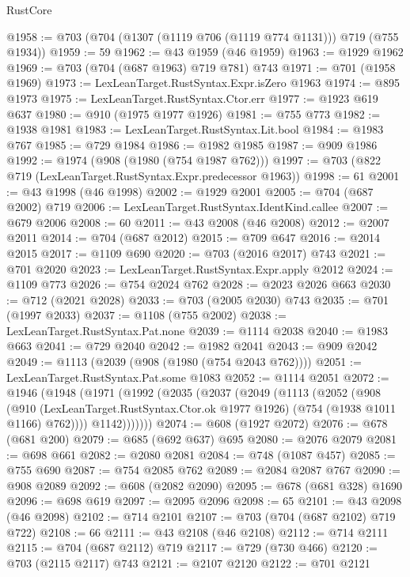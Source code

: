 \begin{lexlean}{RustCore}
\begin{coremodule}
@1958 := @703 (@704 (@1307 (@1119 @706 (@1119 @774 @1131))) @719 (@755 @1934))
@1959 := 59
@1962 := @43 @1959 (@46 @1959)
@1963 := @1929 @1962
@1969 := @703 (@704 (@687 @1963) @719 @781) @743
@1971 := @701 (@1958 @1969)
@1973 := LexLeanTarget.RustSyntax.Expr.isZero @1963
@1974 := @895 @1973
@1975 := LexLeanTarget.RustSyntax.Ctor.err
@1977 := @1923 @619 @637
@1980 := @910 (@1975 @1977 @1926)
@1981 := @755 @773
@1982 := @1938 @1981
@1983 := LexLeanTarget.RustSyntax.Lit.bool
@1984 := @1983 @767
@1985 := @729 @1984
@1986 := @1982 @1985
@1987 := @909 @1986
@1992 := @1974 (@908 (@1980 (@754 @1987 @762)))
@1997 := @703 (@822 @719 (LexLeanTarget.RustSyntax.Expr.predecessor @1963))
@1998 := 61
@2001 := @43 @1998 (@46 @1998)
@2002 := @1929 @2001
@2005 := @704 (@687 @2002) @719
@2006 := LexLeanTarget.RustSyntax.IdentKind.callee
@2007 := @679 @2006
@2008 := 60
@2011 := @43 @2008 (@46 @2008)
@2012 := @2007 @2011
@2014 := @704 (@687 @2012)
@2015 := @709 @647
@2016 := @2014 @2015
@2017 := @1109 @690
@2020 := @703 (@2016 @2017) @743
@2021 := @701 @2020
@2023 := LexLeanTarget.RustSyntax.Expr.apply @2012
@2024 := @1109 @773
@2026 := @754 @2024 @762
@2028 := @2023 @2026 @663
@2030 := @712 (@2021 @2028)
@2033 := @703 (@2005 @2030) @743
@2035 := @701 (@1997 @2033)
@2037 := @1108 (@755 @2002)
@2038 := LexLeanTarget.RustSyntax.Pat.none
@2039 := @1114 @2038
@2040 := @1983 @663
@2041 := @729 @2040
@2042 := @1982 @2041
@2043 := @909 @2042
@2049 := @1113 (@2039 (@908 (@1980 (@754 @2043 @762))))
@2051 := LexLeanTarget.RustSyntax.Pat.some @1083
@2052 := @1114 @2051
@2072 := @1946
    (@1948
      (@1971
        (@1992
          (@2035
            (@2037
              (@2049
                (@1113
                  (@2052
                    (@908
                      (@910
                        (LexLeanTarget.RustSyntax.Ctor.ok @1977 @1926)
                        (@754 (@1938 @1011 @1166) @762))))
                  @1142)))))))
@2074 := @608 (@1927 @2072)
@2076 := @678 (@681 @200)
@2079 := @685 (@692 @637) @695
@2080 := @2076 @2079
@2081 := @698 @661
@2082 := @2080 @2081
@2084 := @748 (@1087 @457)
@2085 := @755 @690
@2087 := @754 @2085 @762
@2089 := @2084 @2087 @767
@2090 := @908 @2089
@2092 := @608 (@2082 @2090)
@2095 := @678 (@681 @328) @1690
@2096 := @698 @619
@2097 := @2095 @2096
@2098 := 65
@2101 := @43 @2098 (@46 @2098)
@2102 := @714 @2101
@2107 := @703 (@704 (@687 @2102) @719 @722)
@2108 := 66
@2111 := @43 @2108 (@46 @2108)
@2112 := @714 @2111
@2115 := @704 (@687 @2112) @719
@2117 := @729 (@730 @466)
@2120 := @703 (@2115 @2117) @743
@2121 := @2107 @2120
@2122 := @701 @2121

\end{coremodule}
\end{lexlean}
